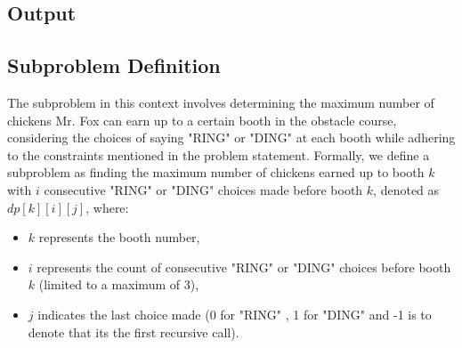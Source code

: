 \documentclass{article}
\begin{document}
\subsection*{\Large{Output}}
\fontsize{12}{15}\selectfont{
A single numeric value (Integer or Float), which is largest number of chickens that Mr. Fox earns by
running the obstacle course.
}

\subsection*{\Large{Subproblem Definition}}
The subproblem in this context involves determining the maximum number of chickens Mr. Fox can earn up to a certain booth in the obstacle course, considering the choices of saying "RING" or "DING" at each booth while adhering to the constraints mentioned in the problem statement. Formally, we define a subproblem as finding the maximum number of chickens earned up to booth $k$ with $i$ consecutive "RING" or "DING" choices made before booth $k$, denoted as $dp[k][i][j]$, where:
\begin{itemize}
    \item $k$ represents the booth number,
    \item $i$ represents the count of consecutive "RING" or "DING" choices before booth $k$ (limited to a maximum of 3),
    \item $j$ indicates the last choice made (0 for "RING" , 1 for "DING" and -1 is to denote that its the first recursive call).
\end{itemize}


\end{document}
